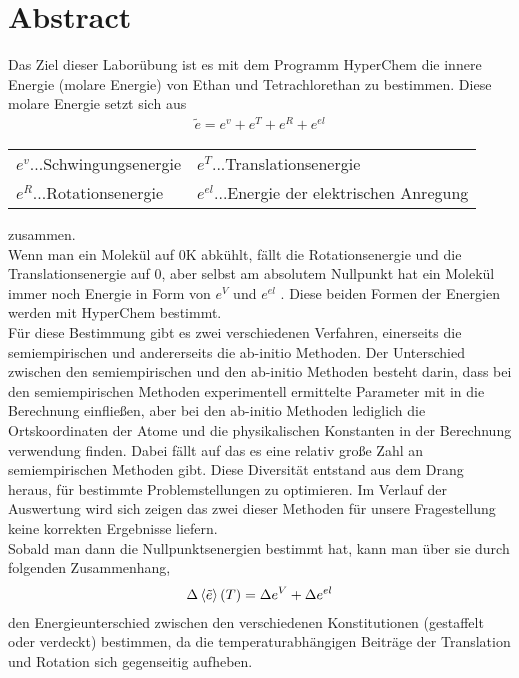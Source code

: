 \section{Abstract}

Das Ziel dieser Laborübung ist es mit dem Programm HyperChem die innere Energie (molare Energie) von Ethan und Tetrachlorethan zu bestimmen.
Diese molare Energie setzt sich aus 
\begin{align}
    \tilde{e} = e^{v} + e^{T} + e^{R} + e^{el}
\end{align}
\begin{table}[H]
    \centering
    \begin{tabular}{ll}
        $e^{v}$...Schwingungsenergie & $e^{T}$...Translationsenergie \\
        $e^{R}$...Rotationsenergie & $e^{el}$...Energie der elektrischen Anregung
    \end{tabular}
\end{table}
zusammen.\\
Wenn man ein Molekül auf 0K abkühlt, fällt die Rotationsenergie und die Translationsenergie auf 0, aber selbst am absolutem Nullpunkt hat ein
Molekül immer noch Energie in Form von $e^V$ und $e^{el}$ . Diese beiden Formen der Energien werden mit HyperChem bestimmt. \\
Für diese Bestimmung gibt es zwei verschiedenen Verfahren, einerseits die semiempirischen und andererseits die ab-initio Methoden.
Der Unterschied zwischen den semiempirischen und den ab-initio Methoden besteht darin, dass bei
den semiempirischen Methoden experimentell ermittelte Parameter mit in die Berechnung einfließen, aber bei den ab-initio Methoden lediglich die 
Ortskoordinaten der Atome und die physikalischen Konstanten in der Berechnung verwendung finden. Dabei fällt auf das es eine relativ große Zahl an
semiempirischen Methoden gibt. Diese Diversität entstand aus dem Drang heraus, für bestimmte Problemstellungen zu optimieren. Im Verlauf der Auswertung
wird sich zeigen das zwei dieser Methoden für unsere Fragestellung keine korrekten Ergebnisse liefern. \\
Sobald man dann die Nullpunktsenergien bestimmt hat, kann man über sie durch folgenden Zusammenhang,
\begin{align}
    \Delta \braket{\tilde{e}} (T) = \Delta e^V + \Delta e^{el} 
\end{align}
den Energieunterschied zwischen den verschiedenen Konstitutionen (gestaffelt oder verdeckt) bestimmen, da die temperaturabhängigen Beiträge der
Translation und Rotation sich gegenseitig aufheben. 
